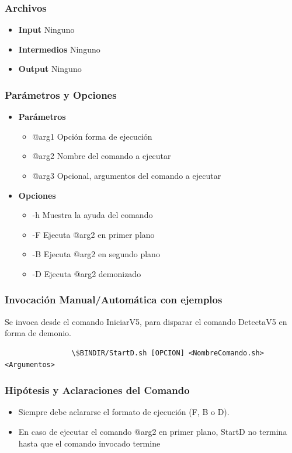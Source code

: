 \documentclass[a4paper,10pt,titlepage]{article}
\begin{document}
		\subsubsection{Archivos}
			\begin {itemize}
				\item \textbf{Input } {Ninguno}
				\item \textbf{Intermedios } {Ninguno}
				\item \textbf{Output } {Ninguno}
			\end{itemize}

		\subsubsection{Par\'ametros y Opciones}
			\begin {itemize}
				\item \textbf{Par\'ametros} {
					\begin{itemize}
						\item {@arg1 }{Opci\'on forma de ejecuci\'on} 
						\item {@arg2 }{Nombre del comando a ejecutar} 
						\item {@arg3 }{Opcional, argumentos del comando a ejecutar} 
					\end{itemize}
				}
				\item \textbf{Opciones}{
					\begin{itemize}
						\item {-h }{Muestra la ayuda del comando} 
						\item {-F }{Ejecuta @arg2 en primer plano} 
						\item {-B }{Ejecuta @arg2 en segundo plano}
						\item {-D }{Ejecuta @arg2 demonizado}
					\end{itemize}
				}
			\end{itemize}
	
		\subsubsection{Invocaci\'on Manual/Autom\'atica con ejemplos}
			Se invoca desde el comando IniciarV5, para disparar el comando DetectaV5 en forma de demonio.
				
			\begin{verbatim}
				\$BINDIR/StartD.sh [OPCION] <NombreComando.sh> <Argumentos>
			\end{verbatim}

		\subsubsection{Hip\'otesis y Aclaraciones del Comando}
			\begin{itemize}
				\item {}{Siempre debe aclararse el formato de ejecuci\'on (F, B o D).}
				\item{}{En caso de ejecutar el comando @arg2 en primer plano, StartD no termina hasta que el comando invocado termine}

			\end{itemize}
\end{document}
